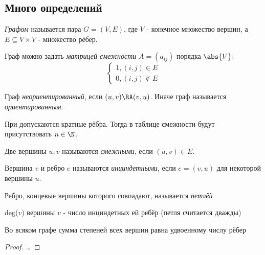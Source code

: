 \documentclass[a4paper, 14pt]{article}
\begin{document}
    \subsection*{Много определений}
    \begin{definition}
        {\it Графом} называется пара $G = (V,E)$, где $V$ - конечное
        множество вершин, а $E \subseteq V \times V$ - множество рёбер.
    \end{definition}
    
    \begin{definition}
        Граф можно задать {\it матрицей смежности} $A = (a_{ij})$ порядка $\abs{V}$:
        \[\begin{cases}
            1, (i,j) \in E \\ 0, (i, j) \notin E
        \end{cases}\]    
    \end{definition}
    
    \begin{definition}
        Граф {\it неориентированный}, если $(u, v) \RA (v, u)$. Иначе
        граф называется {\it ориентированным}.
    \end{definition}

    \begin{definition}
        При {} допускаются кратные рёбра. Тогда в таблице смежности 
        будут присутствовать $n \in \N$.
    \end{definition}
        \begin{definition}
        Две вершины $u, v$ называются {\it смежными}, если $(u, v) \in E$.
    \end{definition}

    \begin{definition}
        Вершина $v$ и ребро $e$ называются {\it инциндетными}, если $e = (v, u)$ для
        некоторой вершины $u$.
    \end{definition}

    \begin{definition}
        Ребро, концевые вершины которого совпадают, называется {\it петлёй}    
    \end{definition}

    \begin{definition}
        {} deg($v$) вершины $v$ - число инциндетных ей ребёр (петля считается дважды)    
    \end{definition}

    \begin{lemma}
        \item Во всяком графе сумма степеней всех вершин равна удвоенному числу рёбер
    \end{lemma}
    \begin{proof}
        \dots    
    \end{proof}
\end{document}

